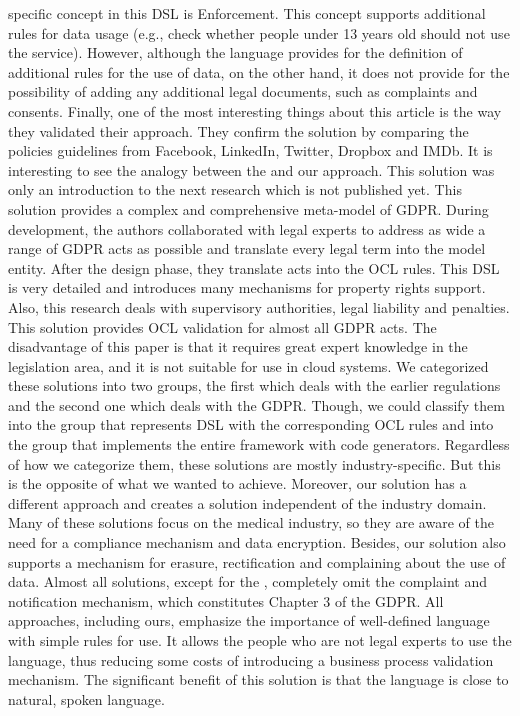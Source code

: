 \documentclass[11pt,english]{article}
\begin{document}
specific concept in this DSL is Enforcement. This concept supports additional rules for data usage (e.g., check whether people under 13 years old should not use the service). However, although the language provides for the definition of additional rules for the use of data, on the other hand, it does not provide for the possibility of adding any additional legal documents, such as complaints and consents. Finally, one of the most interesting things about this article is the way they validated their approach. They confirm the solution by comparing the policies guidelines from Facebook, LinkedIn, Twitter, Dropbox and IMDb. \newline It is interesting to see the analogy between the \cite{torre2019using} and our approach. This solution was only an introduction to the next research  \cite{modeldrivengdpr} which is not published yet. This solution provides a complex and comprehensive meta-model of GDPR. During development, the authors collaborated with legal experts to address as wide a range of GDPR acts as possible and translate every legal term into the model entity. After the design phase, they translate acts into the OCL rules. This DSL is very detailed and introduces many mechanisms for property rights support. Also, this research deals with supervisory authorities, legal liability and penalties. This solution provides OCL validation for almost all GDPR acts. The disadvantage of this paper is that it requires great expert knowledge in the legislation area, and it is not suitable for use in cloud systems. \newline We categorized these solutions into two groups, the first which deals with the earlier regulations and the second one which deals with the GDPR. Though, we could classify them into the group that represents DSL with the corresponding OCL rules and into the group that implements the entire framework with code generators. Regardless of how we categorize them, these solutions are mostly industry-specific. But this is the opposite of what we wanted to achieve. Moreover, our solution has a different approach and creates a solution independent of the industry domain. Many of these solutions focus on the medical industry, so they are aware of the need for a compliance mechanism and data encryption. Besides, our solution also supports a mechanism for erasure, rectification and complaining about the use of data. Almost all solutions, except for the \cite{torre2019using}, completely omit the complaint and notification mechanism, which constitutes Chapter 3 of the GDPR. All approaches, including ours, emphasize the importance of well-defined language with simple rules for use. It allows the people who are not legal experts to use the language, thus reducing some costs of introducing a business process validation mechanism. The significant benefit of this solution is that the language is close to natural, spoken language.
\end{document}
